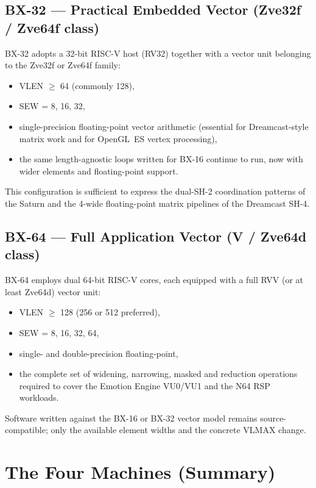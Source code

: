 \documentclass[11pt,a4paper]{article}
\begin{document}
\subsection{BX-32 --- Practical Embedded Vector (Zve32f / Zve64f class)}

BX-32 adopts a 32-bit RISC-V host (RV32) together with a vector unit belonging to the Zve32f or Zve64f family:
\begin{itemize}[leftmargin=1.5em]
  \item VLEN $\ge$ 64 (commonly 128),
  \item SEW = 8, 16, 32,
  \item single-precision floating-point vector arithmetic (essential for Dreamcast-style matrix work and for OpenGL~ES vertex processing),
  \item the same length-agnostic loops written for BX-16 continue to run, now with wider elements and floating-point support.
\end{itemize}
This configuration is sufficient to express the dual-SH-2 coordination patterns of the Saturn and the 4-wide floating-point matrix pipelines of the Dreamcast SH-4.

\subsection{BX-64 --- Full Application Vector (V / Zve64d class)}

BX-64 employs dual 64-bit RISC-V cores, each equipped with a full RVV (or at least Zve64d) vector unit:
\begin{itemize}[leftmargin=1.5em]
  \item VLEN $\ge$ 128 (256 or 512 preferred),
  \item SEW = 8, 16, 32, 64,
  \item single- and double-precision floating-point,
  \item the complete set of widening, narrowing, masked and reduction operations required to cover the Emotion Engine VU0/VU1 and the N64 RSP workloads.
\end{itemize}
Software written against the BX-16 or BX-32 vector model remains source-compatible; only the available element widths and the concrete VLMAX change.

\section{The Four Machines (Summary)}
\end{document}

